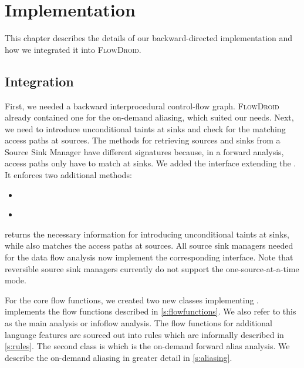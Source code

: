 \documentclass[../draft.tex]{subfiles}
\begin{document}
    \chapter{Implementation}\label{c:implementation}
    This chapter describes the details of our backward-directed implementation and how we integrated it into \textsc{FlowDroid}.

    \section{Integration}
    First, we needed a backward interprocedural control-flow graph.
    \textsc{FlowDroid} already contained one for the on-demand aliasing, which suited our needs.
    Next, we need to introduce unconditional taints at sinks and check for the matching access paths at sources.
    The methods for retrieving sources and sinks from a Source Sink Manager have different signatures because, in a forward analysis, access paths only have to match at sinks.
    We added the interface  extending the .
    It enforces two additional methods:
    \begin{itemize}
        \item {}\\
        \item {}\\
    \end{itemize}
     returns the necessary information for introducing unconditional taints at sinks, while  also matches the access paths at sources.
    All source sink managers needed for the data flow analysis now implement the corresponding interface.
    Note that reversible source sink managers currently do not support the one-source-at-a-time mode.

    For the core flow functions, we created two new classes implementing .
     implements the flow functions described in \autoref{s:flowfunctions}.
    We also refer to this as the main analysis or infoflow analysis\footnotemark{}.
    The flow functions for additional language features are sourced out into rules which are informally described in \autoref{s:rules}.
    The second class is  which is the on-demand forward alias analysis.
    We describe the on-demand aliasing in greater detail in \autoref{s:aliasing}.
\end{document}
